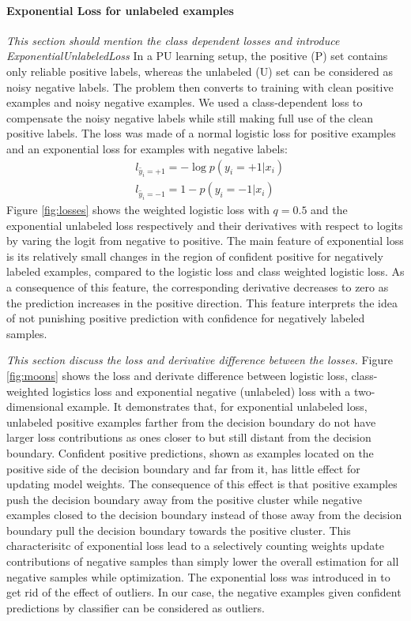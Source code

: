 \paragraph{Exponential Loss for unlabeled examples}
\noindent
\noindent \textit{This section should mention the class dependent losses and introduce ExponentialUnlabeledLoss}
In a PU learning setup, the positive (P) set contains only reliable positive labels, whereas the unlabeled (U) set can be considered as noisy negative labels.
The problem then converts to training with clean positive examples and noisy negative examples.
We used a class-dependent loss to compensate the noisy negative labels while still making full use of the clean positive labels.
The loss was made of a normal logistic loss for positive examples and an exponential loss \cite{tax2016class} for examples with negative labels:
\begin{equation*}
  \begin{aligned}
    & l_{\tilde{y_i}=+1} = - \log p(y_i=+1 \vert x_i) \\
    & l_{\tilde{y_i}=-1} = 1 - p(y_i=-1|x_i)
  \end{aligned}
\end{equation*}
Figure \ref{fig:losses} shows the weighted logistic loss with $q=0.5$ and the exponential unlabeled loss respectively and their derivatives with respect to logits by varing the logit from negative to positive.
The main feature of exponential loss is its relatively small changes in the region of confident positive for negatively labeled examples, compared to the logistic loss and class weighted logistic loss.
As a consequence of this feature, the corresponding derivative decreases to zero as the prediction increases in the positive direction.
This feature interprets the idea of not punishing positive prediction with confidence for negatively labeled samples.

\noindent \textit{This section discuss the loss and derivative difference between the losses.}
\noindent
Figure \ref{fig:moons} shows the loss and derivate difference between logistic loss, class-weighted logistics loss and exponential negative (unlabeled) loss with a two-dimensional example.
It demonstrates that, for exponential unlabeled loss, unlabeled positive examples farther from the decision boundary do not have larger loss contributions as ones closer to but still distant from the decision boundary.
Confident positive predictions, shown as examples located on the positive side of the decision boundary and far from it, has little effect for updating model weights.
The consequence of this effect is that positive examples push the decision boundary away from the positive cluster while negative examples closed to the decision boundary instead of those away from the decision boundary pull the decision boundary towards the positive cluster.
This characterisitc of exponential loss lead to a selectively counting weights update contributions of negative samples than simply lower the overall estimation for all negative samples while optimization.
The exponential loss was introduced in \cite{tax2016class} to get rid of the effect of outliers.
In our case, the negative examples given confident predictions by classifier can be considered as outliers.

